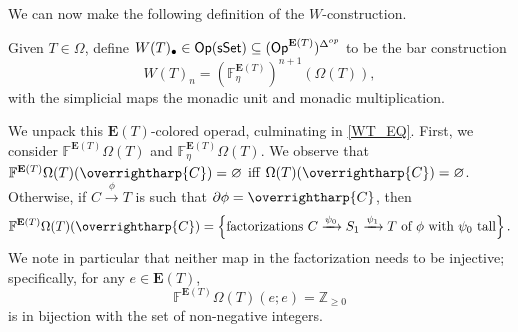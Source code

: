 \documentclass[a4paper,10pt
,draft
]{article}%
\renewcommand{\1}{\eta}%
\newcommand{\vect}[1]{\text{\overrightharp{\ensuremath{#1}}}}
\begin{document}
We can now make the following definition of the $W$-construction.

\begin{definition}
      Given $T \in \Omega$, define $W(T)_\bullet \in \mathsf{Op}(\mathsf{sSet}) \subseteq (\mathsf{Op}^{\mathbf E(T)})^{\Delta^{op}}$ to be the bar construction
      \[
            W(T)_n = \left( \mathbb F^{\mathbf E(T)}_\eta \right)^{n+1} \left(\Omega(T)\right),
      \]
      with the simplicial maps the monadic unit and monadic multiplication.
\end{definition}

We unpack this $\mathbf E(T)$-colored operad, culminating in \eqref{WT_EQ}.
First, we consider $\mathbb F^{\mathbf E(T)} \Omega(T)$ and $\mathbb F^{\mathbf E(T)}_\eta \Omega(T)$.
We observe that $\mathbb F^{\mathbf E(T)} \Omega(T)(\vect C) = \varnothing$ iff $\Omega(T)(\vect C) = \varnothing$.
Otherwise, if $C \xrightarrow{\phi} T$ is such that $\partial \phi = \vect C$, then
\begin{equation}
      \label{FET_EQ}
      \mathbb F^{\mathbf E(T)}\Omega(T)(\vect C)
      = \set{\mbox{factorizations $C \xrightarrow{\psi_0} S_1 \xrightarrow{\psi_1} T$ of $\phi$ with $\psi_0$ tall}}.
\end{equation}
We note in particular that neither map in the factorization needs to be injective;
specifically, for any $e \in \mathbf E(T)$,
\begin{equation}
      \label{FET_EE_EQ}
      \mathbb F^{\mathbf E(T)}\Omega(T)(e;e) = \mathbb Z_{\geq 0}
\end{equation}
is in bijection with the set of non-negative integers.
\end{document}
